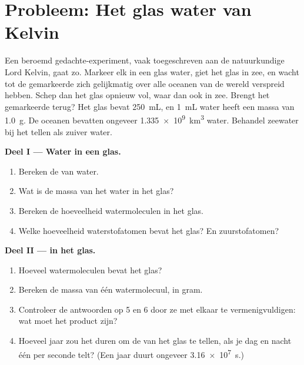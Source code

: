 \section{Probleem: Het glas water van Kelvin}

\begin{problem}
\label{pb:g10:the-mole:1}
Een beroemd gedachte-experiment, vaak toegeschreven aan de natuurkundige
Lord Kelvin, gaat zo. Markeer elk  in een glas water, giet het
glas in zee, en wacht tot de gemarkeerde  zich gelijkmatig over
alle oceanen van de wereld verspreid hebben. Schep dan het glas opnieuw
vol, waar dan ook in zee. Brengt het gemarkeerde  terug? Het
glas bevat \qty{250}{mL}, en \qty{1}{mL} water heeft een massa van
\qty{1.0}{g}. De oceanen bevatten ongeveer \qty{1.335e9}{km^3} water.
Behandel zeewater bij het tellen als zuiver water.

\medskip
\noindent\textbf{Deel I --- Water in een glas.}
\begin{enumerate}
  \item Bereken de  van water.
  \item Wat is de massa van het water in het glas?
  \item Bereken de hoeveelheid watermoleculen in het glas.
  \item Welke hoeveelheid waterstofatomen bevat het glas? En
        zuurstofatomen?
\end{enumerate}

\medskip
\noindent\textbf{Deel II ---  in het glas.}
\begin{enumerate}[resume]
  \item Hoeveel watermoleculen bevat het glas?
  \item Bereken de massa van één watermolecuul, in gram.
  \item Controleer de antwoorden op 5 en 6 door ze met elkaar te
        vermenigvuldigen: wat moet het product zijn?
  \item Hoeveel jaar zou het duren om de  van het glas te
        tellen, als je dag en nacht één  per seconde telt? (Een
        jaar duurt ongeveer \qty{3.16e7}{s}.)
\end{enumerate}


\end{problem}
